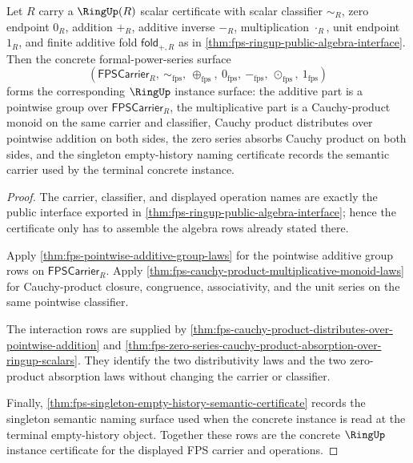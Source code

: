 \begin{theorem}
\label{thm:fps-ringup-concrete-instance-certificate}
Let $R$ carry a $\RingUp(R)$ scalar certificate with scalar classifier
$\sim_R$, zero endpoint $0_R$, addition $+_R$, additive inverse $-_R$,
multiplication $\cdot_R$, unit endpoint $1_R$, and finite additive fold
$\mathsf{fold}_{+,R}$ as in
\autoref{thm:fps-ringup-public-algebra-interface}. Then the concrete
formal-power-series surface
$$
(\mathsf{FPSCarrier}_R,\ \sim_{\mathrm{fps}},\
\oplus_{\mathrm{fps}},\ 0_{\mathrm{fps}},\ -_{\mathrm{fps}},\
\odot_{\mathrm{fps}},\ 1_{\mathrm{fps}})
$$
forms the corresponding $\RingUp$ instance surface: the additive part is a
pointwise group over $\mathsf{FPSCarrier}_R$, the multiplicative part is a
Cauchy-product monoid on the same carrier and classifier, Cauchy product
distributes over pointwise addition on both sides, the zero series absorbs
Cauchy product on both sides, and the singleton empty-history naming certificate
records the semantic carrier used by the terminal concrete instance.
\end{theorem}
\begin{proof}
The carrier, classifier, and displayed operation names are exactly the public
interface exported in \autoref{thm:fps-ringup-public-algebra-interface}; hence
the certificate only has to assemble the algebra rows already stated there.

Apply \autoref{thm:fps-pointwise-additive-group-laws} for the pointwise
additive group rows on $\mathsf{FPSCarrier}_R$. Apply
\autoref{thm:fps-cauchy-product-multiplicative-monoid-laws} for Cauchy-product
closure, congruence, associativity, and the unit series on the same pointwise
classifier.

The interaction rows are supplied by
\autoref{thm:fps-cauchy-product-distributes-over-pointwise-addition} and
\autoref{thm:fps-zero-series-cauchy-product-absorption-over-ringup-scalars}.
They identify the two distributivity laws and the two zero-product absorption
laws without changing the carrier or classifier.

Finally, \autoref{thm:fps-singleton-empty-history-semantic-certificate} records
the singleton semantic naming surface used when the concrete instance is read at
the terminal empty-history object. Together these rows are the concrete
$\RingUp$ instance certificate for the displayed FPS carrier and operations.
\end{proof}

